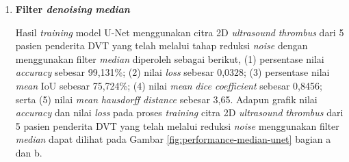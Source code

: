 \begin{enumerate}
	\item \textbf{Filter \textit{denoising} \textit{median}} 
	
	Hasil \textit{training} model U-Net menggunakan citra 2D \textit{ultrasound} \textit{thrombus} dari 5 pasien penderita DVT yang telah melalui tahap reduksi \textit{noise} dengan menggunakan filter \textit{median} diperoleh sebagai berikut, (1) persentase nilai \textit{accuracy} sebesar 99,131\%; (2) nilai \textit{loss} sebesar 0,0328; (3) persentase nilai \textit{mean} IoU sebesar 75,724\%; (4) nilai \textit{mean} \textit{dice coefficient} sebesar 0,8456; serta (5) nilai \textit{mean} \textit{hausdorff distance} sebesar 3,65. Adapun grafik nilai \textit{accuracy} dan nilai \textit{loss} pada proses \textit{training} citra 2D \textit{ultrasound} \textit{thrombus} dari 5 pasien penderita DVT yang telah melalui reduksi \textit{noise} menggunakan filter \textit{median} dapat dilihat pada Gambar \ref{fig:performance-median-unet} bagian a dan b.
	

\end{enumerate}
